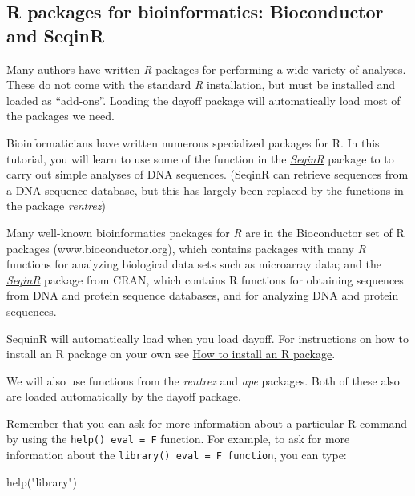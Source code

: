 \documentclass[
]{book}
\newenvironment{Shaded}{\begin{snugshade}}{\end{snugshade}}
\newcommand{\FunctionTok}[1]{\textcolor[rgb]{0.00,0.00,0.00}{#1}}
\newcommand{\NormalTok}[1]{#1}
\newcommand{\StringTok}[1]{\textcolor[rgb]{0.31,0.60,0.02}{#1}}
\begin{document}
\hypertarget{r-packages-for-bioinformatics-bioconductor-and-seqinr}{%
\subsection{R packages for bioinformatics: Bioconductor and SeqinR}\label{r-packages-for-bioinformatics-bioconductor-and-seqinr}}

Many authors have written \emph{R} packages for performing a wide variety of analyses. These do not come with the standard \emph{R} installation, but must be installed and loaded as ``add-ons''. Loading the dayoff package will automatically load most of the packages we need.

Bioinformaticians have written numerous specialized packages for R. In this tutorial, you will learn to use some of the function in the \href{https://cran.r-project.org/web/packages/seqinr/index.html}{\emph{SeqinR}} package to to carry out simple analyses of DNA sequences. (SeqinR can retrieve sequences from a DNA sequence database, but this has largely been replaced by the functions in the package \emph{rentrez})

Many well-known bioinformatics packages for \emph{R} are in the Bioconductor set of R packages (www.bioconductor.org), which contains packages with many \emph{R} functions for analyzing biological data sets such as microarray data; and the \href{https://cran.r-project.org/web/packages/seqinr/index.html}{\emph{SeqinR}} package from CRAN, which contains R functions for obtaining sequences from DNA and protein sequence databases, and for analyzing DNA and protein sequences.

SequinR will automatically load when you load dayoff. For instructions on how to install an R package on your own see \href{https://a-little-book-of-r-for-bioinformatics.readthedocs.io/en/latest/src/installr.html}{How to install an R package}.

We will also use functions from the \emph{rentrez} and \emph{ape} packages. Both of these also are loaded automatically by the dayoff package.

Remember that you can ask for more information about a particular R command by using the \texttt{help()\ eval\ =\ F} function. For example, to ask for more information about the \texttt{library()\ eval\ =\ F\ function}, you can type:

\begin{Shaded}
\begin{Highlighting}[]
\FunctionTok{help}\NormalTok{(}\StringTok{"library"}\NormalTok{)}
\end{Highlighting}
\end{Shaded}
\end{document}
